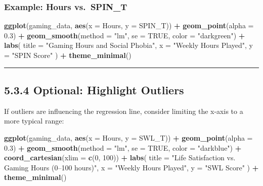 \documentclass[
]{book}
\newenvironment{Shaded}{\begin{snugshade}}{\end{snugshade}}
\newcommand{\AttributeTok}[1]{\textcolor[rgb]{0.13,0.29,0.53}{#1}}
\newcommand{\ConstantTok}[1]{\textcolor[rgb]{0.56,0.35,0.01}{#1}}
\newcommand{\DecValTok}[1]{\textcolor[rgb]{0.00,0.00,0.81}{#1}}
\newcommand{\FloatTok}[1]{\textcolor[rgb]{0.00,0.00,0.81}{#1}}
\newcommand{\FunctionTok}[1]{\textcolor[rgb]{0.13,0.29,0.53}{\textbf{#1}}}
\newcommand{\NormalTok}[1]{#1}
\newcommand{\SpecialCharTok}[1]{\textcolor[rgb]{0.81,0.36,0.00}{\textbf{#1}}}
\newcommand{\StringTok}[1]{\textcolor[rgb]{0.31,0.60,0.02}{#1}}
\begin{document}
\subsubsection{Example: Hours vs.~SPIN\_T}\label{example-hours-vs.-spin_t}

\begin{Shaded}
\begin{Highlighting}[]
\FunctionTok{ggplot}\NormalTok{(gaming\_data, }\FunctionTok{aes}\NormalTok{(}\AttributeTok{x =}\NormalTok{ Hours, }\AttributeTok{y =}\NormalTok{ SPIN\_T)) }\SpecialCharTok{+}
  \FunctionTok{geom\_point}\NormalTok{(}\AttributeTok{alpha =} \FloatTok{0.3}\NormalTok{) }\SpecialCharTok{+}
  \FunctionTok{geom\_smooth}\NormalTok{(}\AttributeTok{method =} \StringTok{"lm"}\NormalTok{, }\AttributeTok{se =} \ConstantTok{TRUE}\NormalTok{, }\AttributeTok{color =} \StringTok{"darkgreen"}\NormalTok{) }\SpecialCharTok{+}
  \FunctionTok{labs}\NormalTok{(}
    \AttributeTok{title =} \StringTok{"Gaming Hours and Social Phobia"}\NormalTok{,}
    \AttributeTok{x =} \StringTok{"Weekly Hours Played"}\NormalTok{,}
    \AttributeTok{y =} \StringTok{"SPIN Score"}
\NormalTok{  ) }\SpecialCharTok{+}
  \FunctionTok{theme\_minimal}\NormalTok{()}
\end{Highlighting}
\end{Shaded}

\begin{center}\rule{0.5\linewidth}{0.5pt}\end{center}

\subsection{5.3.4 Optional: Highlight Outliers}\label{optional-highlight-outliers}

If outliers are influencing the regression line, consider limiting the x-axis to a more typical range:

\begin{Shaded}
\begin{Highlighting}[]
\FunctionTok{ggplot}\NormalTok{(gaming\_data, }\FunctionTok{aes}\NormalTok{(}\AttributeTok{x =}\NormalTok{ Hours, }\AttributeTok{y =}\NormalTok{ SWL\_T)) }\SpecialCharTok{+}
  \FunctionTok{geom\_point}\NormalTok{(}\AttributeTok{alpha =} \FloatTok{0.3}\NormalTok{) }\SpecialCharTok{+}
  \FunctionTok{geom\_smooth}\NormalTok{(}\AttributeTok{method =} \StringTok{"lm"}\NormalTok{, }\AttributeTok{se =} \ConstantTok{TRUE}\NormalTok{, }\AttributeTok{color =} \StringTok{"darkblue"}\NormalTok{) }\SpecialCharTok{+}
  \FunctionTok{coord\_cartesian}\NormalTok{(}\AttributeTok{xlim =} \FunctionTok{c}\NormalTok{(}\DecValTok{0}\NormalTok{, }\DecValTok{100}\NormalTok{)) }\SpecialCharTok{+}
  \FunctionTok{labs}\NormalTok{(}
    \AttributeTok{title =} \StringTok{"Life Satisfaction vs. Gaming Hours (0–100 hours)"}\NormalTok{,}
    \AttributeTok{x =} \StringTok{"Weekly Hours Played"}\NormalTok{,}
    \AttributeTok{y =} \StringTok{"SWL Score"}
\NormalTok{  ) }\SpecialCharTok{+}
  \FunctionTok{theme\_minimal}\NormalTok{()}
\end{Highlighting}
\end{Shaded}
\end{document}
